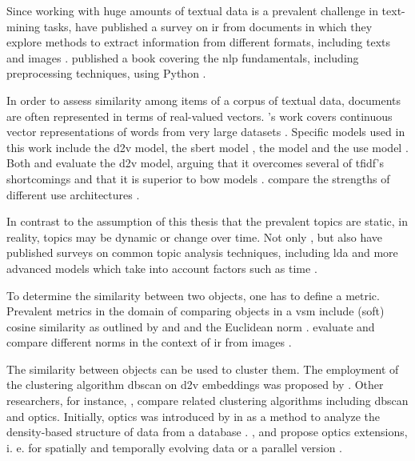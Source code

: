 Since working with huge amounts of textual data is a prevalent challenge in text-mining tasks,
\citeauthor{InformationRetrieval1999} have published a survey on \ac{ir} from documents in which
they explore methods to extract information from different formats, including texts and images \cite{InformationRetrieval1999}.
\citeauthor{nlp-book2009} published a book covering the \ac{nlp} fundamentals, including preprocessing techniques, using Python \cite{nlp-book2009}.

In order to assess similarity among items of a corpus of textual data, documents are often represented in terms of real-valued vectors.
\citeauthor{WordRep2013}'s work covers continuous vector representations of words from very large datasets \cite{WordRep2013}.
Specific models used in this work include 
the \ac{d2v} model, the \ac{sbert} model \cite{HfsentTrans2019}, the \infersent{} model \cite{inferSent2018} and the \ac{use} model \cite{UniversalSentEnc2018}.
Both \citeauthor{clusteringDocs2020} and \citeauthor{SentRep2014} evaluate the \ac{d2v} model, 
arguing that it overcomes several of \ac{tfidf}'s shortcomings \cite{clusteringDocs2020} and that it is superior to \ac{bow} models \cite{SentRep2014}.
\citeauthor{UniversalSentEnc2018} compare the strengths of different \ac{use} architectures \cite{UniversalSentEnc2018}.

In contrast to the assumption of this thesis that the prevalent topics are static, in reality, topics may be dynamic or change over time.
Not only \citeauthor{topic_modeling2015}, but also \citeauthor{topic_modeling2020} have published surveys on common topic analysis techniques, 
including \ac{lda} and more advanced models which take into account factors such as time \cite{topic_modeling2015, topic_modeling2020}.

To determine the similarity between two objects, one has to define a metric.
Prevalent metrics in the domain of comparing objects in a \ac{vsm} include (soft) cosine similarity 
as outlined by \citeauthor{soft_cosine2014} and \citeauthor{soft_cosine2017} \cite{soft_cosine2014, soft_cosine2017}
and the Euclidean norm \cite{euclidean_l2_norm2015}.
\citeauthor{euclidean_l2_norm2015} evaluate and compare different norms in the context of \ac{ir} from images \cite{euclidean_l2_norm2015}.


The similarity between objects can be used to cluster them.
The employment of the clustering algorithm \ac{dbscan} on \ac{d2v} embeddings was proposed by \citeauthor{clusteringDocs2020} \cite{clusteringDocs2020}.
Other researchers, for instance, \citeauthor{OPTICS_kMeans_2016}, compare related clustering algorithms including \ac{dbscan} and \ac{optics}.
Initially, \ac{optics} was introduced by \citeauthor{OPTICS1999} in \citeyear{OPTICS1999} as a method to analyze the density-based structure of data from a database \cite{OPTICS1999}.
\citeauthor{OPTICS2013}, \citeauthor{OPTICS2014} and \citeauthor{OPTICS2016} propose \ac{optics} extensions, 
i. e. for spatially and temporally evolving data or a parallel version \cite{OPTICS2013, OPTICS2014, OPTICS2016}.


